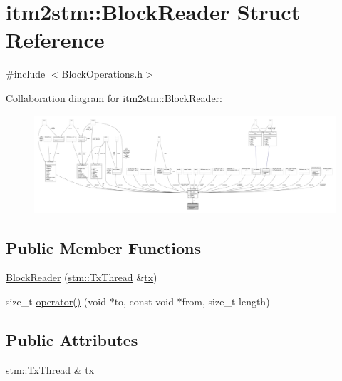 \hypertarget{structitm2stm_1_1BlockReader}{\section{itm2stm\-:\-:Block\-Reader Struct Reference}
\label{structitm2stm_1_1BlockReader}
}


{\ttfamily \#include $<$Block\-Operations.\-h$>$}



Collaboration diagram for itm2stm\-:\-:Block\-Reader\-:
\nopagebreak
\begin{figure}[H]
\begin{center}
\leavevmode
\includegraphics[width=350pt]{structitm2stm_1_1BlockReader__coll__graph}
\end{center}
\end{figure}
\subsection*{Public Member Functions}
\begin{DoxyCompactItemize}
\item 
\hyperlink{structitm2stm_1_1BlockReader_a69d68ac8e09541c00413b1030b9b5ec8}{Block\-Reader} (\hyperlink{structstm_1_1TxThread}{stm\-::\-Tx\-Thread} \&\hyperlink{stmskip_8cc_a0f1c58699b83ce5a08bd9ee859250d72}{tx})
\item 
size\-\_\-t \hyperlink{structitm2stm_1_1BlockReader_a967b0c639adba84b3e30e4b47b332136}{operator()} (void $\ast$to, const void $\ast$from, size\-\_\-t length)
\end{DoxyCompactItemize}
\subsection*{Public Attributes}
\begin{DoxyCompactItemize}
\item 
\hyperlink{structstm_1_1TxThread}{stm\-::\-Tx\-Thread} \& \hyperlink{structitm2stm_1_1BlockReader_ab9d0a4c731a6fd2127694dfe080bac53}{tx\-\_\-}
\end{DoxyCompactItemize}



